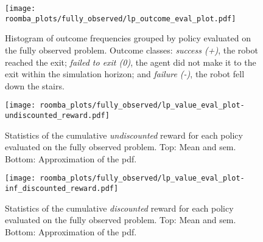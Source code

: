 \begin{appendix}
\begin{figure}[htpb]
  \centering
  \texttt{[image: roomba\_plots/fully\_observed/lp\_outcome\_eval\_plot.pdf]}
\caption{Histogram of outcome frequencies grouped by policy evaluated on the
         fully observed problem. Outcome classes: \emph{success (+)}, the robot
         reached the exit; \emph{failed to exit (0)}, the agent did not make it to the
         exit within the simulation horizon; and \emph{failure (-)}, the robot fell
         down the stairs.}
	\label{fig:lp_outcome_fo}
\end{figure}

\begin{figure}[htpb]
  \centering
  \texttt{[image: roomba\_plots/fully\_observed/lp\_value\_eval\_plot-undiscounted\_reward.pdf]}
  \caption{Statistics of the cumulative \emph{undiscounted} reward for each
           policy evaluated on the fully observed problem. Top: Mean and \acf{sem}.
           Bottom: Approximation of the \acf{pdf}.}
  \label{fig:lp_eval_undiscounted_fo}
\end{figure}

\begin{figure}[htpb]
  \centering
  \texttt{[image: roomba\_plots/fully\_observed/lp\_value\_eval\_plot-inf\_discounted\_reward.pdf]}
  \caption{Statistics of the cumulative \emph{discounted} reward for each
           policy evaluated on the fully observed problem. Top: Mean and \acf{sem}.
           Bottom: Approximation of the \acf{pdf}.}
  \label{fig:lp_eval_infdiscounted_fo}
\end{figure}

\end{appendix}
